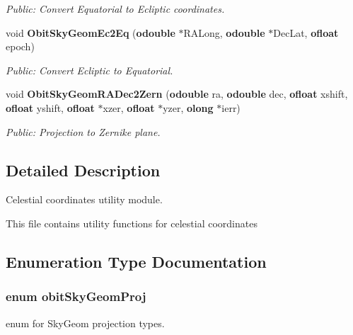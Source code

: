 \begin{CompactItemize}
\begin{CompactList}\small\item\em Public: Convert Equatorial to Ecliptic coordinates. \item\end{CompactList}\item 
void {\bf Obit\-Sky\-Geom\-Ec2Eq} ({\bf odouble} $\ast$RALong, {\bf odouble} $\ast$Dec\-Lat, {\bf ofloat} epoch)
\begin{CompactList}\small\item\em Public: Convert Ecliptic to Equatorial. \item\end{CompactList}\item 
void {\bf Obit\-Sky\-Geom\-RADec2Zern} ({\bf odouble} ra, {\bf odouble} dec, {\bf ofloat} xshift, {\bf ofloat} yshift, {\bf ofloat} $\ast$xzer, {\bf ofloat} $\ast$yzer, {\bf olong} $\ast$ierr)
\begin{CompactList}\small\item\em Public: Projection to Zernike plane. \item\end{CompactList}\end{CompactItemize}


\subsection{Detailed Description}
Celestial coordinates utility module. 

This file contains utility functions for celestial coordinates

\subsection{Enumeration Type Documentation}
\subsubsection{\setlength{\rightskip}{0pt plus 5cm}enum {\bf obit\-Sky\-Geom\-Proj}}\label{ObitSkyGeom_8h_a26}


enum for Sky\-Geom projection types. 

